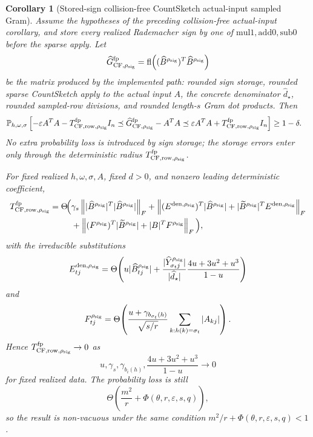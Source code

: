 \documentclass[11pt]{article}
\newcommand{\Prob}{\mathbb{P}}
\newcommand{\Frob}[1]{\left\lVert #1\right\rVert_F}
\newcommand{\fl}{\operatorname{fl}}
\newcommand{\I}{I}
\newcommand{\eps}{\varepsilon}
\newtheorem{corollary}[theorem]{Corollary}
\theoremstyle{remark}
\begin{document}
\begin{corollary}[Stored-sign collision-free CountSketch actual-input sampled Gram]
Assume the hypotheses of the preceding collision-free actual-input corollary,
and store every realized Rademacher sign by one of
\(\mathrm{mul1},\mathrm{add0},\mathrm{sub0}\) before the sparse apply.  Let
\[
  \widehat G_{{\rm CF},\rho_{\rm sig}}^{\rm fp}
  =
  \fl\!\left(
    (\widehat B^{\rho_{\rm sig}})^T
    \widehat B^{\rho_{\rm sig}}\right)
\]
be the matrix produced by the implemented path: rounded sign storage, rounded
sparse CountSketch apply to the actual input \(A\), the concrete denominator
\(\widehat d_\star\), rounded sampled-row divisions, and rounded length-\(s\)
Gram dot products.  Then
\[
\begin{aligned}
&\Prob_{h,\omega,\sigma}
  \left[
    -\eps A^TA-T_{{\rm CF,row},\rho_{\rm sig}}^{\rm fp}\I_n
    \preceq
    \widehat G_{{\rm CF},\rho_{\rm sig}}^{\rm fp}-A^TA
    \preceq
    \eps A^TA+T_{{\rm CF,row},\rho_{\rm sig}}^{\rm fp}\I_n
  \right]
  \ge 1-\delta .
\end{aligned}
\]
No extra probability loss is introduced by sign storage; the storage errors
enter only through the deterministic radius \(T_{{\rm CF,row},\rho_{\rm sig}}^{\rm fp}\).

For fixed realized \(h,\omega,\sigma,A\), fixed \(d>0\), and nonzero leading
deterministic coefficient,
\[
\begin{aligned}
  T_{{\rm CF,row},\rho_{\rm sig}}^{\rm fp}
  =
  \Theta\!\Big(
  &\gamma_s\Frob{
      |\widehat B^{\rho_{\rm sig}}|^T
      |\widehat B^{\rho_{\rm sig}}|}
  +
  \Frob{
      (E^{{\rm den},\rho_{\rm sig}})^T
      |\widehat B^{\rho_{\rm sig}}|
      +
      |\widetilde B^{\rho_{\rm sig}}|^T
      E^{{\rm den},\rho_{\rm sig}}}
  \\
  &+
  \Frob{
      (F^{\rho_{\rm sig}})^T|\widetilde B^{\rho_{\rm sig}}|
      +
      |B|^TF^{\rho_{\rm sig}}}
  \Big),
\end{aligned}
\]
with the irreducible substitutions
\[
  E^{{\rm den},\rho_{\rm sig}}_{tj}
  =
  \Theta\!\left(
    u|\widehat B^{\rho_{\rm sig}}_{tj}|
    +
    \frac{|\widehat Y^{\rho_{\rm sig}}_{\sigma_tj}|}
         {|\widehat d_\star|}
    \frac{4u+3u^2+u^3}{1-u}
  \right)
\]
and
\[
  F^{\rho_{\rm sig}}_{tj}
  =
  \Theta\!\left(
    \frac{u+\gamma_{b_{\sigma_t}(h)}}{\sqrt{s/r}}
    \sum_{k:h(k)=\sigma_t}|A_{kj}|
  \right).
\]
Hence \(T_{{\rm CF,row},\rho_{\rm sig}}^{\rm fp}\to0\) as
\[
  u,\gamma_s,\gamma_{b_i(h)},\frac{4u+3u^2+u^3}{1-u}\to0
\]
for fixed realized data.  The probability loss is still
\[
  \Theta\!\left(\frac{m^2}{r}+\Phi(\theta,r,\eps,s,q)\right),
\]
so the result is non-vacuous under the same condition
\(m^2/r+\Phi(\theta,r,\eps,s,q)<1\).
\end{corollary}
\end{document}
